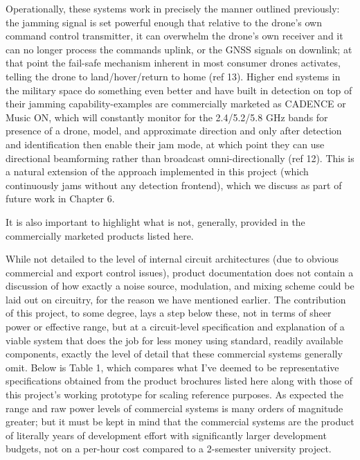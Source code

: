 \documentclass[12pt,a4paper]{report}
\begin{document}
	Operationally, these systems work in precisely the manner outlined previously: the jamming signal is set powerful enough that relative to the drone’s own command control transmitter, it can overwhelm the drone’s own receiver and it can no longer process the commands uplink, or the GNSS signals on downlink; at that point the fail-safe mechanism inherent in most consumer drones activates, telling the drone to land/hover/return to home (ref 13). Higher end systems in the military space do something even better and have built in detection on top of their jamming capability-examples are commercially marketed as CADENCE or Music ON, which will constantly monitor for the 2.4/5.2/5.8 GHz bands for presence of a drone, model, and approximate direction and only after detection and identification then enable their jam mode, at which point they can use directional beamforming rather than broadcast omni-directionally (ref 12). This is a natural extension of the approach implemented in this project (which continuously jams without any detection frontend), which we discuss as part of future work in Chapter 6. 
	
	It is also important to highlight what is not, generally, provided in the commercially marketed products listed here. 
	
	While not detailed to the level of internal circuit architectures (due to obvious commercial and export control issues), product documentation does not contain a discussion of how exactly a noise source, modulation, and mixing scheme could be laid out on circuitry, for the reason we have mentioned earlier. The contribution of this project, to some degree, lays a step below these, not in terms of sheer power or effective range, but at a circuit-level specification and explanation of a viable system that does the job for less money using standard, readily available components, exactly the level of detail that these commercial systems generally omit. Below is Table 1, which compares what I’ve deemed to be representative specifications obtained from the product brochures listed here along with those of this project’s working prototype for scaling reference purposes. As expected the range and raw power levels of commercial systems is many orders of magnitude greater; but it must be kept in mind that the commercial systems are the product of literally years of development effort with significantly larger development budgets, not on a per-hour cost compared to a 2-semester university project.
	
\end{document}
